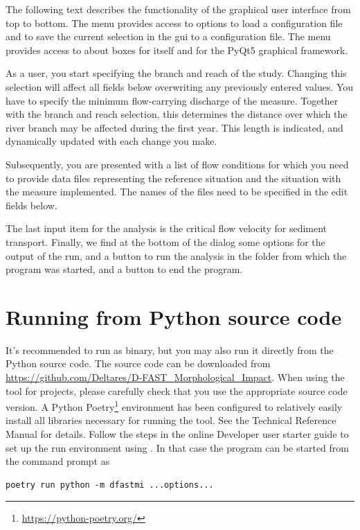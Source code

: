 The following text describes the functionality of the graphical user interface from top to bottom.
The  menu provides access to options to load a configuration file and to save the current selection in the gui to a configuration file.
The  menu provides access to about boxes for \dfastmi itself and for the PyQt5 graphical framework.

As a user, you start specifying the branch and reach of the study.
Changing this selection will affect all fields below overwriting any previously entered values.
You have to specify the minimum flow-carrying discharge of the measure.
Together with the branch and reach selection, this determines the distance over which the river branch may be affected during the first year.
This length  is indicated, and dynamically updated with each change you make.

Subsequently, you are presented with a list of flow conditions for which you need to provide data files representing the reference situation and the situation with the measure implemented.
The names of the files need to be specified in the edit fields below.

The last input item for the analysis is the critical flow velocity  for sediment transport.
Finally, we find at the bottom of the dialog some options for the output of the \dfastmi run, and a button to run the analysis in the folder from which the program was started, and a button to end the program.

\section{Running from Python source code}
It's recommended to run \dfastmi as binary, but you may also run it directly from the Python source code.
The source code can be downloaded from \url{https://github.com/Deltares/D-FAST_Morphological_Impact}.
When using the tool for projects, please carefully check that you use the appropriate source code version.
A Python Poetry\footnote{\url{https://python-poetry.org/}} environment has been configured to relatively easily install all libraries necessary for running the tool.
See the \dfastmi Technical Reference Manual for details.
Follow the steps in the online Developer user starter guide to set up the run environment using .
In that case the program can be started from the command prompt as

\begin{Verbatim}
poetry run python -m dfastmi ...options...
\end{Verbatim}

